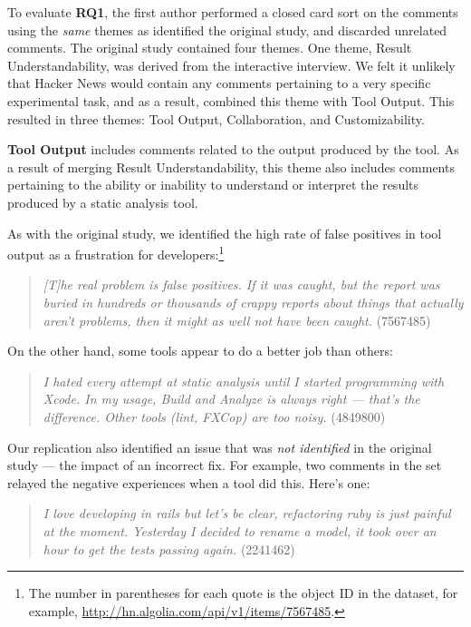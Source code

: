 \documentclass{sig-alternate}
\begin{document}
To evaluate \textbf{RQ1}, the first author performed a closed card sort on the comments using the \emph{same} themes as identified the original study, and discarded unrelated comments. The original study contained four themes. One theme, Result Understandability, was derived from the interactive interview. We felt it unlikely that Hacker News would contain any comments pertaining to a very specific experimental task, and as a result, combined this theme with Tool Output. This resulted in three themes: Tool Output, Collaboration, and Customizability.

\textbf{Tool Output} includes comments related to the output produced by the tool. As a result of merging Result Understandability, this theme also includes comments pertaining to the ability or inability to understand or interpret the results produced by a static analysis tool.

As with the original study, we identified the high rate of false positives in tool output as a frustration for developers:\footnote{The number in parentheses for each quote is the object ID in the dataset, for example, \url{http://hn.algolia.com/api/v1/items/7567485}.}

\begin{quote}
\textit{[T]he real problem is false positives.  If it was caught, but the report was buried in hundreds or thousands of crappy reports about things that actually aren't problems, then it might as well not have been caught.} (7567485)
\end{quote}

On the other hand, some tools appear to do a better job than others:

\begin{quote}
\textit{I hated every attempt at static analysis until I started programming with Xcode. In my usage, Build and Analyze is always right --- that's the difference. Other tools (lint, FXCop) are too noisy.} (4849800)
\end{quote}

Our replication also identified an issue that was \textit{not identified} in the original study --- the impact of an incorrect fix. For example, two comments in the set relayed the negative experiences when a tool did this. Here's one:

\begin{quote}
\textit{I love developing in rails but let's be clear, refactoring ruby is just painful at the moment. Yesterday I decided to rename a model, it took over an hour to get the tests passing again.} (2241462)
\end{quote}
\end{document}

